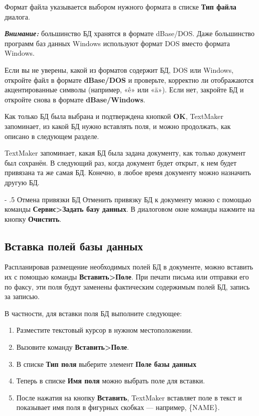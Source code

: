 ﻿\documentclass[a4paper,10pt]{article}
\makeatletter
\renewcommand\paragraph{%
   \@startsection{paragraph}{4}{0mm}%
      {-\baselineskip}%
      {.5\baselineskip}%
      {\normalfont\normalsize\bfseries}}
\makeatother
\begin{document}
Формат файла указывается выбором нужного формата в списке \textbf{Тип файла} диалога.

\begin{mdframed}[backgroundcolor=blue!10]
\textbf{\textit{Внимание:}} большинство БД хранятся в формате dBase/DOS. Даже большинство программ баз данных Windows используют формат DOS вместо формата Windows.
\end{mdframed}

Если вы не уверены, какой из форматов содержит БД, DOS или Windows, откройте файл в формате \textbf{dBase/DOS} и проверьте, корректно ли отображаются акцентированные символы (например, «ê» или «ä»). Если нет, закройте БД и откройте снова в формате \textbf{dBase/Windows}.

Как только БД была выбрана и подтверждена кнопкой \textbf{OK}, TextMaker запоминает, из какой БД нужно вставлять поля, и можно продолжать, как описано в следующем разделе.

TextMaker запоминает, какая БД была задана документу, как только документ был сохранён. В следующий раз, когда документ будет открыт, к нем будет привязана та же самая БД. Конечно, в любое время документу можно назначить другую БД.

\paragraph{Отмена привязки БД}
Отменить привязку БД к документу можно с помощью команды \textbf{Сервис>Задать базу данных}. В диалоговом окне команды нажмите на кнопку \textbf{Очистить}.

\subsection{Вставка полей базы данных}
Распланировав размещение необходимых полей БД в документе, можно вставить их с помощью команды \textbf{Вставить>Поле}. При печати письма или отправки его по факсу, эти поля будут заменены фактическим содержимым полей БД, запись за записью.

В частности, для вставки поля БД выполните следующее:

\begin{enumerate}
 \item Разместите текстовый курсор в нужном местоположении.
 \item Вызовите команду \textbf{Вставить>Поле}.
 \item В списке \textbf{Тип поля} выберите элемент \textbf{Поле базы данных}
 \item Теперь в списке \textbf{Имя поля} можно выбрать поле для вставки.
 \item После нажатия на кнопку \textbf{Вставить}, TextMaker вставляет поле в текст и показывает имя поля в фигурных скобках — например, \{NAME\}.
\end{enumerate}
\end{document}
